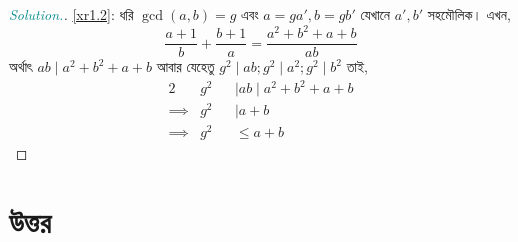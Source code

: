 \documentclass[a4paper,11pt]{article}
\newenvironment{sltn}{\begin{proof}[\emph{\textcolor{darkcyan}{Solution.}}]} {\end{proof}}
\begin{document}
\begin{Answer}[ref={gcd}]
	\begin{sltn}
		\ref{xr1.2}: ধরি $\gcd(a,b)=g$ এবং $a=ga',b=gb'$ যেখানে $a',b'$ সহমৌলিক। এখন, 
		\[\dfrac{a+1}{b}+\dfrac{b+1}{a}=\dfrac{a^2+b^2+a+b}{ab}\]
		অর্থাৎ $ab\mid a^2+b^2+a+b$ আবার যেহেতু $g^2\mid ab; g^2\mid a^2; g^2\mid b^2$ তাই, 
		\begin{alignat*}{2}
			         & g^2 &  & \mid ab \mid a^2+b^2+a+b \\
			\implies & g^2 &  & \mid a+b                 \\
			\implies & g^2 &  & \leq a+b 
		\end{alignat*}
	\end{sltn}
\end{Answer}
\newpage
\section{উত্তর}
\shipoutAnswer
\end{document}

